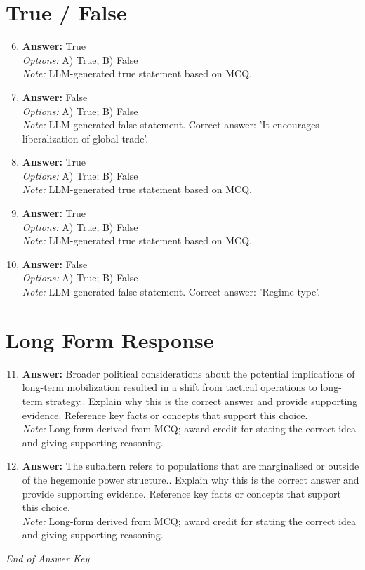 \documentclass[12pt]{article}
\begin{document}
\section*{True / False}
\begin{enumerate}[label=\arabic*.]
\setcounter{enumi}{5}
\item \textbf{Answer:} True
\\ \textit{Options:} A) True; B) False
\\ \textit{Note:} LLM-generated true statement based on MCQ.
\item \textbf{Answer:} False
\\ \textit{Options:} A) True; B) False
\\ \textit{Note:} LLM-generated false statement. Correct answer: 'It encourages liberalization of global trade'.
\item \textbf{Answer:} True
\\ \textit{Options:} A) True; B) False
\\ \textit{Note:} LLM-generated true statement based on MCQ.
\item \textbf{Answer:} True
\\ \textit{Options:} A) True; B) False
\\ \textit{Note:} LLM-generated true statement based on MCQ.
\item \textbf{Answer:} False
\\ \textit{Options:} A) True; B) False
\\ \textit{Note:} LLM-generated false statement. Correct answer: 'Regime type'.
\end{enumerate}

\section*{Long Form Response}
\begin{enumerate}[label=\arabic*.]
\setcounter{enumi}{10}
\item \textbf{Answer:} Broader political considerations about the potential implications of long-term mobilization resulted in a shift from tactical operations to long-term strategy.. Explain why this is the correct answer and provide supporting evidence. Reference key facts or concepts that support this choice.
\\ \textit{Note:} Long-form derived from MCQ; award credit for stating the correct idea and giving supporting reasoning.
\item \textbf{Answer:} The subaltern refers to populations that are marginalised or outside of the hegemonic power structure.. Explain why this is the correct answer and provide supporting evidence. Reference key facts or concepts that support this choice.
\\ \textit{Note:} Long-form derived from MCQ; award credit for stating the correct idea and giving supporting reasoning.
\end{enumerate}

\vfill
\noindent\textit{End of Answer Key}
\end{document}
